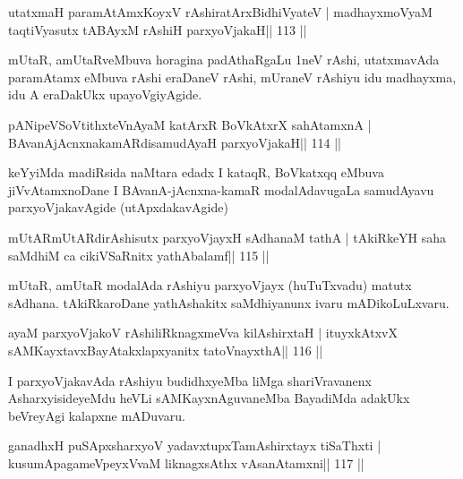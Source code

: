\begin{shl}
utatxmaH paramAtAmxKoyxV rAshiratArxBidhiVyateV |
madhayxmoV\s yaM taqtiVyasutx tABAyxM rAshiH parxyoVjakaH\hfill || 113 ||
\end{shl}

\begin{artha}
mUtaR, amUtaRveMbuva horagina padAthaRgaLu 1neV rAshi, utatxmavAda paramAtamx eMbuva rAshi eraDaneV rAshi, mUraneV rAshiyu idu madhayxma, idu A eraDakUkx upayoVgiyAgide.
\end{artha}


\begin{shl}
pANipeVSoVtithxteVnAyaM katArxR BoVkAtxrX sahA\s\s tamxnA |
BAvanAjAcnxnakamARdisamudAyaH parxyoVjakaH\hfill || 114 ||
\end{shl}

\begin{artha}
keYyiMda madiRsida naMtara edadx I kataqR, BoVkatxqq eMbuva
jiVvAtamxnoDane I BAvanA-jAcnxna-kamaR modalAdavugaLa samudAyavu
parxyoVjakavAgide (utApxdakavAgide)
\end{artha}

\begin{shl}
mUtARmUtARdirAshisutx parxyoVjayxH sAdhanaM tathA |
tAkiRkeYH saha saMdhiM ca cikiVSaRnitx yathAbalamf\hfill || 115 ||
\end{shl}

\begin{artha}
mUtaR, amUtaR modalAda rAshiyu parxyoVjayx (huTuTxvadu) matutx sAdhana.
tAkiRkaroDane yathAshakitx saMdhiyanunx ivaru mADikoLuLxvaru. 
\end{artha}

\begin{shl}
ayaM parxyoVjakoV rAshiliRknagxmeVva kilA\s\s shirxtaH |
ituyxkAtxvX sAMKayxtavxBayAtakxlapxyanitx tatoV\s nayxthA\hfill || 116 ||
\end{shl}

\begin{artha}
I parxyoVjakavAda rAshiyu budidhxyeMba liMga shariVravanenx
AsharxyisideyeMdu heVLi sAMKayxnAguvaneMba BayadiMda adakUkx beVreyAgi
kalapxne mADuvaru.
\end{artha}



\begin{shl}
ganadhxH puSApxsharxyoV yadavxtupxTamAshirxtayx tiSaThxti |
kusumApagameV\s peyxVvaM liknagxsAthx vAsanA\s\s tamxni\hfill || 117 ||
\end{shl}

